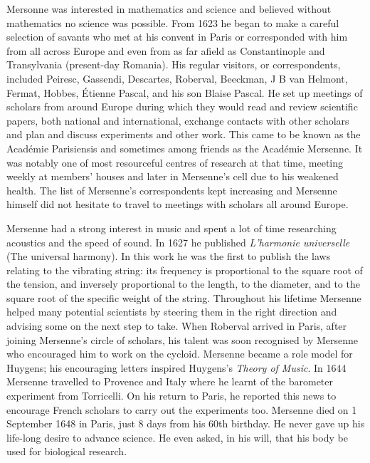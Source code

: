 \documentclass[b5paper]{article}
\begin{document}
\begin{mdframed}
Mersonne was interested in mathematics and science and believed without mathematics no science was possible. From 1623 he began to make a careful selection of savants who met at his convent in Paris or corresponded with him from all across Europe and even from as far afield as Constantinople and Transylvania (present-day Romania). His regular visitors, or correspondents, included Peiresc, Gassendi, Descartes, Roberval, Beeckman, J B van Helmont, Fermat, Hobbes, Étienne Pascal, and his son Blaise Pascal. He set up meetings of scholars from around Europe during which they would read and review scientific papers, both national and international, exchange contacts with other scholars and plan and discuss experiments and other work. This came to be known as the Académie Parisiensis and sometimes among friends as the Académie Mersenne. It was notably one of most resourceful centres of research at that time, meeting weekly at members' houses and later in Mersenne's cell due to his weakened health. The list of Mersenne's correspondents kept increasing and Mersenne himself did not hesitate to travel to meetings with scholars all around Europe.

Mersenne had a strong interest in music and spent a lot of time researching acoustics and the speed of sound. In 1627 he published \emph{L'harmonie universelle} (The universal harmony). In this work he was the first to publish the laws relating to the vibrating string: its frequency is proportional to the square root of the tension, and inversely proportional to the length, to the diameter, and to the square root of the specific weight of the string. Throughout his lifetime Mersenne helped many potential scientists by steering them in the right direction and advising some on the next step to take. When Roberval arrived in Paris, after joining Mersenne's circle of scholars, his talent was soon recognised by Mersenne who encouraged him to work on the cycloid. Mersenne became a role model for Huygens; his encouraging letters inspired Huygens's \emph{Theory of Music}. In 1644 Mersenne travelled to Provence and Italy where he learnt of the barometer experiment from Torricelli. On his return to Paris, he reported this news to encourage French scholars to carry out the experiments too. Mersenne died on 1 September 1648 in Paris, just 8 days from his 60th birthday. He never gave up his life-long desire to advance science. He even asked, in his will, that his body be used for biological research\cite{OConnor-Robertson-2005}.


\end{mdframed}
\end{document}
